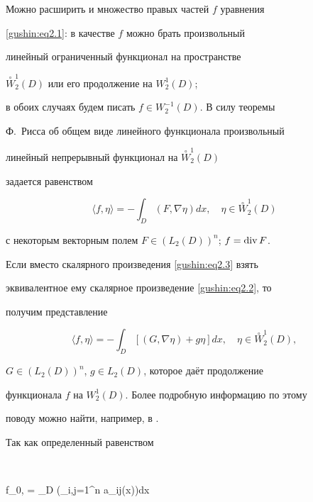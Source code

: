 \smallskip



Можно расширить и множество правых частей $f$ уравнения

\eqref{gushin:eq2.1}: в качестве $f$ можно брать произвольный

линейный ограниченный функционал на пространстве

${\stackrel{\circ}{W}_2^1(D)}$ или его продолжение на $W_2^1(D)$;

в обоих случаях будем писать $f \in W_2^{-1}(D)$. В силу теоремы

Ф.~Рисса об общем виде линейного функционала  произвольный

линейный непрерывный функционал на ${\stackrel{\circ}{W}_2^1(D)}$

задается равенством

\begin{equation}

\label{gushin:eq2.6} \langle f, \eta\rangle = - \int _D (F,

\nabla\eta) dx, \quad \eta \in {\stackrel{\circ}{W}_2^1(D)}

\end{equation}

с некоторым векторным полем $F \in (L_2(D))^n$; $f = \mathop{\rm div} F$.

Если вместо скалярного произведения \eqref{gushin:eq2.3} взять

эквивалентное ему скалярное произведение \eqref{gushin:eq2.2}, то

получим представление

\begin{equation}

\label{gushin:eq2.7} \langle f, \eta\rangle = - \int _D

\left[(G, \nabla\eta) + g \eta  \right] dx, \quad \eta \in

{\stackrel{\circ}{W}_2^1(D)},

\end{equation}

$G \in (L_2(D))^n$, $g \in L_2(D)$, которое даёт продолжение

функционала $f$ на $W_2^1(D)$. Более подробную информацию по этому

поводу  можно найти, например, в  \cite{gushin:Nots}.



Так как определенный равенством

$$

\langle f_0, \eta\rangle = \int _D \biggl(\sum_{i,j=1}^n a_{ij}(x)\biggr)dx

